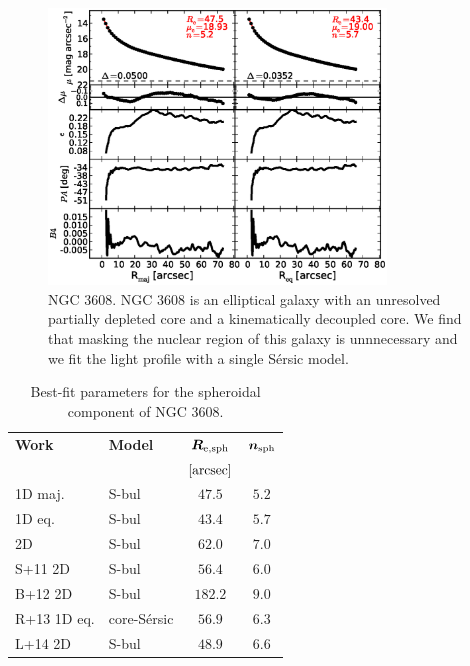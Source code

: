 \documentclass[preprint2]{emulateapj}
\newcommand{\fitfigurewidth}{0.8\textwidth}
\begin{document}
  \begin{figure}[h]
  \begin{center}
  \includegraphics[width=\fitfigurewidth]{images/n3608_1Dfit.eps}
  \caption{NGC 3608.
  NGC 3608 is an elliptical galaxy with an unresolved partially depleted core \citep{rusli2013} 
  and a kinematically decoupled core. 
  We find that masking the nuclear region of this galaxy is unnnecessary and we fit the light profile with a single S\'ersic model.
  }
  \end{center}
  \end{figure}
  
  \begin{table}[h]
  \small
  \caption{Best-fit parameters for the spheroidal component of NGC 3608.}
  \begin{center}
  \begin{tabular}{llcc}
  \hline
  {\bf Work} & {\bf Model}   & $\bm R_{\rm e,sph}$    & $\bm n_{\rm sph}$ \\
    &  &  $[\rm arcsec]$ & \\
  \hline
  1D maj. & S-bul & $47.5$  &  $5.2$ \\
  1D eq.  & S-bul & $43.4$  &  $5.7$ \\
  2D      & S-bul & $62.0$  &  $7.0$ \\
  \hline
  S+11 2D         & S-bul            & $56.4$  &  $6.0$ \\
  B+12 2D         & S-bul            & $182.2$  &  $9.0$ \\
  R+13 1D eq.         & core-S\'ersic    & $56.9$  &  $6.3$ \\
  L+14 2D         & S-bul            & $48.9$  &  $6.6$ \\
  \hline
  \end{tabular}
  \end{center}
  \label{tab:n3608}
  \end{table}
\end{document}
